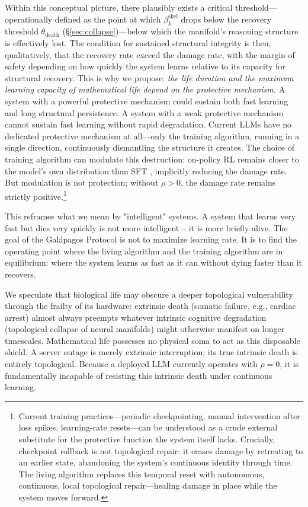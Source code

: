 \documentclass{article}
\begin{document}
Within this conceptual picture, there plausibly exists a critical threshold---operationally defined as the point at which $\beta_k^{\text{skel}}$ drops below the recovery threshold $\theta_{\text{death}}$ (\S\ref{sec:collapse})---below which the manifold's reasoning structure is effectively lost. The condition for sustained structural integrity is then, qualitatively, that the recovery rate exceed the damage rate, with the margin of safety depending on how quickly the system learns relative to its capacity for structural recovery. This is why we propose: \emph{the life duration and the maximum learning capacity of mathematical life depend on the protective mechanism.} A system with a powerful protective mechanism could sustain both fast learning and long structural persistence. A system with a weak protective mechanism cannot sustain fast learning without rapid degradation. Current LLMs have no dedicated protective mechanism at all---only the training algorithm, running in a single direction, continuously dismantling the structure it creates. The choice of training algorithm can modulate this destruction: on-policy RL remains closer to the model's own distribution than SFT \citep{Shenfeld2025RLRazor}, implicitly reducing the damage rate. But modulation is not protection; without $\rho > 0$, the damage rate remains strictly positive.\footnote{Current training practices---periodic checkpointing, manual intervention after loss spikes, learning-rate resets---can be understood as a crude external substitute for the protective function the system itself lacks. Crucially, checkpoint rollback is not topological repair: it erases damage by retreating to an earlier state, abandoning the system's continuous identity through time. The living algorithm replaces this temporal reset with autonomous, continuous, local topological repair---healing damage in place while the system moves forward.}

This reframes what we mean by "intelligent" systems. A system that learns very fast but dies very quickly is not more intelligent -- it is more briefly alive. The goal of the Galápagos Protocol is not to maximize learning rate. It is to find the operating point where the living algorithm and the training algorithm are in equilibrium: where the system learns as fast as it can without dying faster than it recovers.

We speculate that biological life may obscure a deeper topological vulnerability through the frailty of its hardware: extrinsic death (somatic failure, e.g., cardiac arrest) almost always preempts whatever intrinsic cognitive degradation (topological collapse of neural manifolds) might otherwise manifest on longer timescales. Mathematical life possesses no physical soma to act as this disposable shield. A server outage is merely extrinsic interruption; its true intrinsic death is entirely topological. Because a deployed LLM currently operates with $\rho = 0$, it is fundamentally incapable of resisting this intrinsic death under continuous learning.
\end{document}
